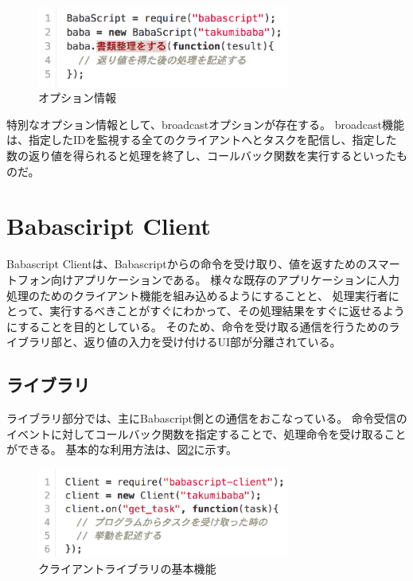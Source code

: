 \documentclass[twoside]{wiss}
\begin{document}
\begin{figure}[h]
  \centering  
  \includegraphics[width=83mm, bb=0 0 751 241]{./images/script_02.png}
  \caption{オプション情報}
  \label{script_02}
\end{figure}

特別なオプション情報として、broadcastオプションが存在する。
broadcast機能は、指定したIDを監視する全てのクライアントへとタスクを配信し、指定した数の返り値を得られると処理を終了し、コールバック関数を実行するといったものだ。



\section{Babasciript Client}

Babascript Clientは、Babascriptからの命令を受け取り、値を返すためのスマートフォン向けアプリケーションである。
様々な既存のアプリケーションに人力処理のためのクライアント機能を組み込めるようにすることと、
処理実行者にとって、実行するべきことがすぐにわかって、その処理結果をすぐに返せるようにすることを目的としている。
そのため、命令を受け取る通信を行うためのライブラリ部と、返り値の入力を受け付けるUI部が分離されている。

\subsection{ライブラリ}
ライブラリ部分では、主にBabascript側との通信をおこなっている。
命令受信のイベントに対してコールバック関数を指定することで、処理命令を受け取ることができる。
基本的な利用方法は、図\ref{client}に示す。

\begin{figure}[h]
  \centering
  \includegraphics[width=83mm, bb=0 0 779 277]{./images/client.png}
  \caption{クライアントライブラリの基本機能 }
  \label{client}
\end{figure}
\end{document}

